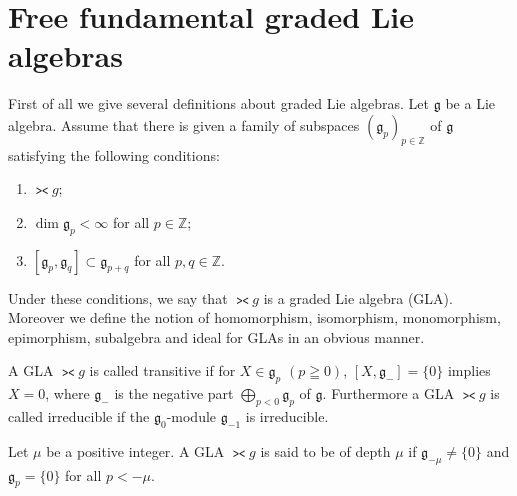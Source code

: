 \section{Free fundamental graded Lie algebras}\label{section2}

First of all we give several def\/initions about graded Lie algebras.
Let $\mathfrak g$ be a Lie algebra. Assume that there is given a family of
subspaces $(\mathfrak g_p)_{p\in\mathbb Z}$ of $\mathfrak g$ satisfying
the following conditions:
\begin{enumerate}\itemsep=0pt
\renewcommand{\labelenumi}{$(\roman{enumi})$}
\item $\gla g$;
\item $\dim \mathfrak g_p<\infty$ for all $p\in\mathbb Z$;
\item $[\mathfrak g_p,\mathfrak g_q]\subset \mathfrak g_{p+q}$
for all $p,q\in\mathbb Z$.
\end{enumerate}
Under these conditions, we say that $\gla g$ is a graded Lie algebra (GLA).
Moreover we def\/ine the notion of homomorphism, isomorphism, monomorphism,
epimorphism, subalgebra and
ideal for GLAs in an obvious manner.

A GLA $\gla g$ is called transitive if
for $X\in\mathfrak g_p$ $(p\geqq0)$, $[X,\mathfrak g_-]=\{0\}$ implies $X=0$,
where $\mathfrak g_-$ is the negative part
$\bigoplus\limits_{p<0}\mathfrak g_p$ of $\mathfrak g$.
Furthermore a GLA $\gla g$ is called irreducible if
the $\mathfrak g_0$-module $\mathfrak g_{-1}$ is irreducible.

Let $\mu$ be a positive integer. A GLA
$\gla g$ is said to be of depth $\mu$ if $\mathfrak g_{-\mu}\ne\{0\}$ and
$\mathfrak g_p=\{0\}$ for all $p<-\mu$.

